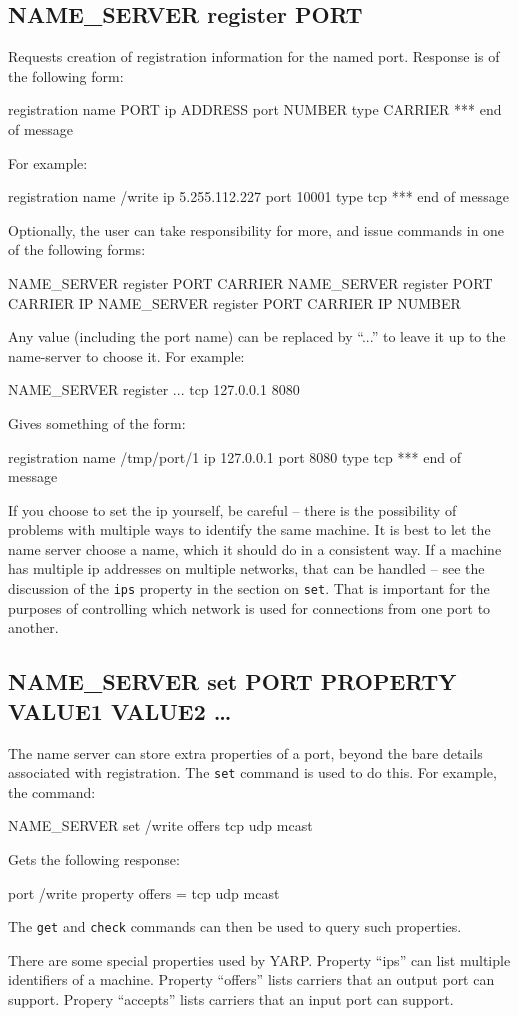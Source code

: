 \documentclass[a4]{article}
\newenvironment{codecase}[1]{\subsection{#1}}{}
\begin{document}
\begin{codecase}{NAME\_SERVER register PORT}

Requests creation of registration information for the named port.  
Response is of the following form:
\begin{code}
registration name PORT ip ADDRESS port NUMBER type CARRIER
*** end of message
\end{code}
For example:
\begin{code}
registration name /write ip 5.255.112.227 port 10001 type tcp
*** end of message
\end{code}
%
Optionally, the user can take responsibility for more, and 
issue commands in one of the following forms:
\begin{code}
NAME_SERVER register PORT CARRIER
NAME_SERVER register PORT CARRIER IP
NAME_SERVER register PORT CARRIER IP NUMBER
\end{code}
Any value (including the port name) can be replaced by ``...'' to leave it 
up to the name-server to choose it.  For example:
\begin{code}
NAME_SERVER register ... tcp 127.0.0.1 8080
\end{code}
Gives something of the form:
\begin{code}
registration name /tmp/port/1 ip 127.0.0.1 port 8080 type tcp
*** end of message
\end{code}
If you choose to set the ip yourself, be careful -- there is the 
possibility of problems with multiple ways to identify the same
machine.  It is best to let the name server choose a name,
which it should do in a consistent way.  If a machine has
multiple ip addresses on multiple networks, that can be 
handled -- see the 
discussion of the {\tt ips} property in the section on {\tt set}.
That is important for the purposes of controlling which 
network is used for connections from one port to another.


\end{codecase}

\begin{codecase}{NAME\_SERVER set PORT PROPERTY VALUE1 VALUE2 \ldots}

The name server can store extra properties of a port, beyond the
bare details associated with registration.  The {\tt set} command
is used to do this.  For example, the command:
\begin{code}
NAME_SERVER set /write offers tcp udp mcast
\end{code}
Gets the following response:
\begin{code}
port /write property offers = tcp udp mcast
\end{code}
The {\tt get} and {\tt check} commands can then be used to query
such properties.

There are some special properties used by YARP.  Property ``ips''
can list multiple identifiers of a machine.  Property ``offers''
lists carriers that an output port can support.  Propery ``accepts''
lists carriers that an input port can support.

\end{codecase}
\end{document}
